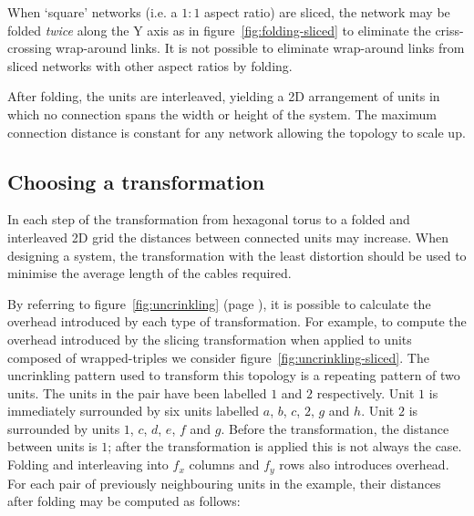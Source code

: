 			When `square' networks (i.e. a $1:1$ aspect ratio) are sliced, the
			network may be folded \emph{twice} along the Y axis as in
			figure~\ref{fig:folding-sliced} to eliminate the criss-crossing
			wrap-around links. It is not possible to eliminate wrap-around links from
			sliced networks with other aspect ratios by folding.
			
			After folding, the units are interleaved, yielding a 2D arrangement of
			units in which no connection spans the width or height of the system. The
			maximum connection distance is constant for any network allowing the
			topology to scale up.
		
		\subsection{Choosing a transformation}
			
			\label{sec:distortion}
			
			In each step of the transformation from hexagonal torus to a folded and
			interleaved 2D grid the distances between connected units may increase.
			When designing a system, the transformation with the least distortion
			should be used to minimise the average length of the cables required.
			
			By referring to figure~\ref{fig:uncrinkling} (page
			\pageref{fig:uncrinkling}), it is possible to calculate the overhead
			introduced by each type of transformation.  For example, to compute the
			overhead introduced by the slicing transformation when applied to units
			composed of wrapped-triples we consider
			figure~\ref{fig:uncrinkling-sliced}. The uncrinkling pattern used to
			transform this topology is a repeating pattern of two units. The units in
			the pair have been labelled $1$ and $2$ respectively. Unit $1$ is
			immediately surrounded by six units labelled $a$, $b$, $c$, $2$, $g$ and
			$h$. Unit $2$ is surrounded by units $1$, $c$, $d$, $e$, $f$ and $g$.
			Before the transformation, the distance between units is $1$; after the
			transformation is applied this is not always the case. Folding and
			interleaving into $f_x$ columns and $f_y$ rows also introduces overhead.
			For each pair of previously neighbouring units in the example, their
			distances after folding may be computed as follows:
			
